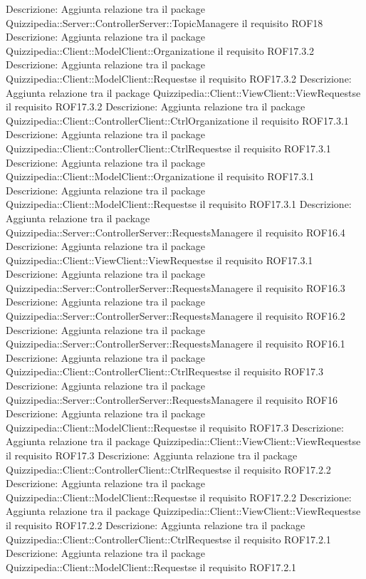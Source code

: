 Descrizione: Aggiunta relazione tra il package Quizzipedia::Server::ControllerServer::TopicManagere il requisito ROF18 
Descrizione: Aggiunta relazione tra il package Quizzipedia::Client::ModelClient::Organizatione il requisito ROF17.3.2 
Descrizione: Aggiunta relazione tra il package Quizzipedia::Client::ModelClient::Requestse il requisito ROF17.3.2 
Descrizione: Aggiunta relazione tra il package Quizzipedia::Client::ViewClient::ViewRequestse il requisito ROF17.3.2 
Descrizione: Aggiunta relazione tra il package Quizzipedia::Client::ControllerClient::CtrlOrganizatione il requisito ROF17.3.1 
Descrizione: Aggiunta relazione tra il package Quizzipedia::Client::ControllerClient::CtrlRequestse il requisito ROF17.3.1 
Descrizione: Aggiunta relazione tra il package Quizzipedia::Client::ModelClient::Organizatione il requisito ROF17.3.1 
Descrizione: Aggiunta relazione tra il package Quizzipedia::Client::ModelClient::Requestse il requisito ROF17.3.1 
Descrizione: Aggiunta relazione tra il package Quizzipedia::Server::ControllerServer::RequestsManagere il requisito ROF16.4 
Descrizione: Aggiunta relazione tra il package Quizzipedia::Client::ViewClient::ViewRequestse il requisito ROF17.3.1 
Descrizione: Aggiunta relazione tra il package Quizzipedia::Server::ControllerServer::RequestsManagere il requisito ROF16.3 
Descrizione: Aggiunta relazione tra il package Quizzipedia::Server::ControllerServer::RequestsManagere il requisito ROF16.2 
Descrizione: Aggiunta relazione tra il package Quizzipedia::Server::ControllerServer::RequestsManagere il requisito ROF16.1 
Descrizione: Aggiunta relazione tra il package Quizzipedia::Client::ControllerClient::CtrlRequestse il requisito ROF17.3 
Descrizione: Aggiunta relazione tra il package Quizzipedia::Server::ControllerServer::RequestsManagere il requisito ROF16 
Descrizione: Aggiunta relazione tra il package Quizzipedia::Client::ModelClient::Requestse il requisito ROF17.3 
Descrizione: Aggiunta relazione tra il package Quizzipedia::Client::ViewClient::ViewRequestse il requisito ROF17.3 
Descrizione: Aggiunta relazione tra il package Quizzipedia::Client::ControllerClient::CtrlRequestse il requisito ROF17.2.2 
Descrizione: Aggiunta relazione tra il package Quizzipedia::Client::ModelClient::Requestse il requisito ROF17.2.2 
Descrizione: Aggiunta relazione tra il package Quizzipedia::Client::ViewClient::ViewRequestse il requisito ROF17.2.2 
Descrizione: Aggiunta relazione tra il package Quizzipedia::Client::ControllerClient::CtrlRequestse il requisito ROF17.2.1 
Descrizione: Aggiunta relazione tra il package Quizzipedia::Client::ModelClient::Requestse il requisito ROF17.2.1 
